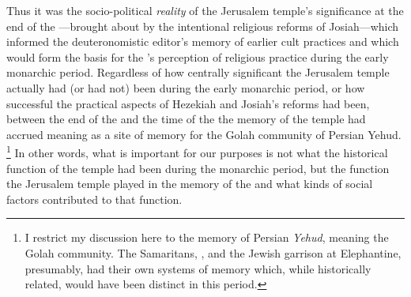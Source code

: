 Thus it was the socio-political \emph{reality} of the Jerusalem temple's significance at the end of the ---brought about by the intentional religious reforms of Josiah---which informed the deuteronomistic editor's memory of earlier \yahwistic cult practices and which would form the basis for the \chronicler's perception of religious practice during the early monarchic period. Regardless of how centrally significant the Jerusalem temple actually had (or had not) been during the early monarchic period, or how successful the practical aspects of Hezekiah and Josiah's reforms had been, between the end of the  and the time of the \chronicler the memory of the temple had accrued meaning as a site of memory for the Golah community of Persian Yehud.%
    \footnote{I restrict my discussion here to the memory of Persian \emph{Yehud}, meaning the Golah community. The Samaritans, , and the Jewish garrison at Elephantine, presumably, had their own systems of memory which, while historically related, would have been distinct in this period.}
In other words, what is important for our purposes is not what the historical function of the temple had been during the monarchic period, but the function the Jerusalem temple played in the memory of the \chronicler and what kinds of social factors contributed to that function.

